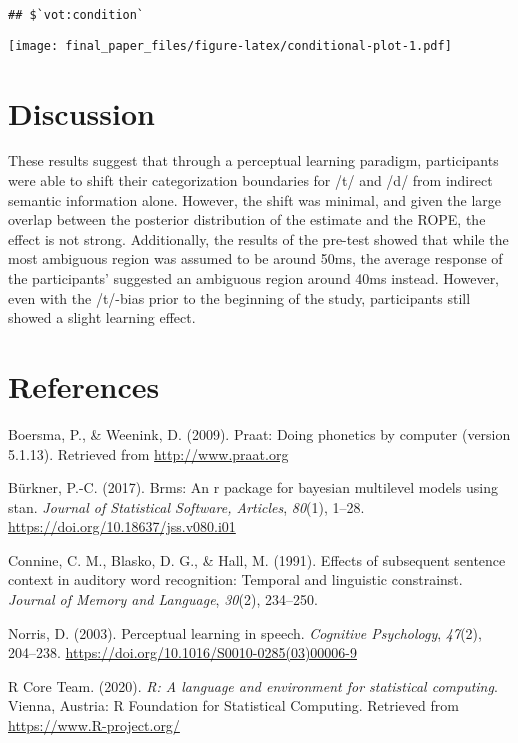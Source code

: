 \documentclass[
  english,
  man]{apa6}
\newlength{\cslhangindent}
\newenvironment{CSLReferences}[2] %
 {%
  \setlength{\parindent}{0pt}
  \ifodd #1 \everypar{\setlength{\hangindent}{\cslhangindent}}\ignorespaces\fi
  \ifnum #2 > 0
  \setlength{\parskip}{#2\baselineskip}
  \fi
 }%
 {}
\begin{document}
\begin{verbatim}
## $`vot:condition`
\end{verbatim}

\texttt{[image: final\_paper\_files/figure-latex/conditional-plot-1.pdf]}

\hypertarget{discussion}{%
\section{Discussion}\label{discussion}}

These results suggest that through a perceptual learning paradigm, participants were able to shift their categorization boundaries for /t/ and /d/ from indirect semantic information alone. However, the shift was minimal, and given the large overlap between the posterior distribution of the estimate and the ROPE, the effect is not strong. Additionally, the results of the pre-test showed that while the most ambiguous region was assumed to be around 50ms, the average response of the participants' suggested an ambiguous region around 40ms instead. However, even with the /t/-bias prior to the beginning of the study, participants still showed a slight learning effect.

\newpage

\hypertarget{references}{%
\section{References}\label{references}}

\begingroup
\setlength{\parindent}{-0.5in}
\setlength{\leftskip}{0.5in}

\hypertarget{refs}{}
\begin{CSLReferences}{1}{0}
\leavevmode{}%
Boersma, P., \& Weenink, D. (2009). Praat: Doing phonetics by computer (version 5.1.13). Retrieved from \url{http://www.praat.org}

\leavevmode{}%
Bürkner, P.-C. (2017). Brms: An r package for bayesian multilevel models using stan. \emph{Journal of Statistical Software, Articles}, \emph{80}(1), 1--28. \url{https://doi.org/10.18637/jss.v080.i01}

\leavevmode{}%
Connine, C. M., Blasko, D. G., \& Hall, M. (1991). Effects of subsequent sentence context in auditory word recognition: Temporal and linguistic constrainst. \emph{Journal of Memory and Language}, \emph{30}(2), 234--250.

\leavevmode{}%
Norris, D. (2003). Perceptual learning in speech. \emph{Cognitive Psychology}, \emph{47}(2), 204--238. \url{https://doi.org/10.1016/S0010-0285(03)00006-9}

\leavevmode{}%
R Core Team. (2020). \emph{R: A language and environment for statistical computing}. Vienna, Austria: R Foundation for Statistical Computing. Retrieved from \url{https://www.R-project.org/}

\end{CSLReferences}

\endgroup
\end{document}
